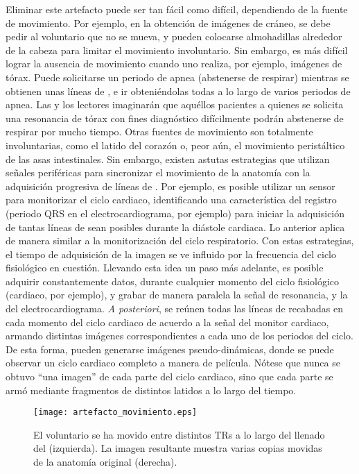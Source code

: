 Eliminar este artefacto puede ser tan fácil como difícil, dependiendo de la fuente de movimiento. Por ejemplo, en la obtención de imágenes de cráneo, se debe pedir al voluntario que no se mueva, y pueden colocarse almohadillas alrededor de la cabeza para limitar el movimiento involuntario. Sin embargo, es más difícil lograr la ausencia de movimiento cuando uno realiza, por ejemplo, imágenes de tórax. Puede solicitarse un periodo de apnea (abstenerse de respirar) mientras se obtienen unas líneas de \espaciok, e ir obteniéndolas todas a lo largo de varios periodos de apnea. Las y los lectores imaginarán que aquéllos pacientes a quienes se solicita una resonancia de tórax con fines diagnóstico difícilmente podrán abstenerse de respirar por mucho tiempo. Otras fuentes de movimiento son totalmente involuntarias, como el latido del corazón o, peor aún, el movimiento peristáltico de las asas intestinales. Sin embargo, existen astutas estrategias que utilizan señales periféricas para sincronizar el movimiento de la anatomía con la adquisición progresiva de líneas de \espaciok. Por ejemplo, es posible utilizar un sensor para monitorizar el ciclo  cardiaco, identificando una característica del registro (periodo QRS en el electrocardiograma, por ejemplo) para iniciar la adquisición de tantas líneas de \espaciok sean posibles durante la diástole cardiaca. Lo anterior aplica de manera similar a la monitorización del ciclo respiratorio. Con estas estrategias, el tiempo de adquisición de la imagen se ve influido por la frecuencia del ciclo fisiológico en cuestión. Llevando esta idea un paso más adelante, es posible adquirir constantemente datos, durante cualquier momento del ciclo fisiológico (cardiaco, por ejemplo), y grabar de manera paralela la señal de resonancia, y la del electrocardiograma. \textit{A posteriori}, se reúnen todas las líneas de \espaciok recabadas en cada momento del ciclo cardiaco de acuerdo a la señal del monitor cardiaco, armando distintas imágenes correspondientes a cada uno de los periodos del ciclo. De esta forma, pueden generarse imágenes pseudo-dinámicas, donde se puede observar un ciclo cardiaco completo a manera de película. Nótese que nunca se obtuvo ``una imagen'' de cada parte del ciclo cardiaco, sino que cada parte se armó mediante fragmentos de distintos latidos a lo largo del tiempo.

\begin{figure}[htb]
 \begin{figg}
   \texttt{[image: artefacto\_movimiento.eps]}
   \caption{El voluntario se ha movido entre distintos TRs a lo largo del llenado del \espaciok (izquierda). La imagen resultante muestra varias copias movidas de la anatomía original (derecha).}
 \label{fig:artefacto_movimiento}
 \end{figg}
\end{figure}
 


